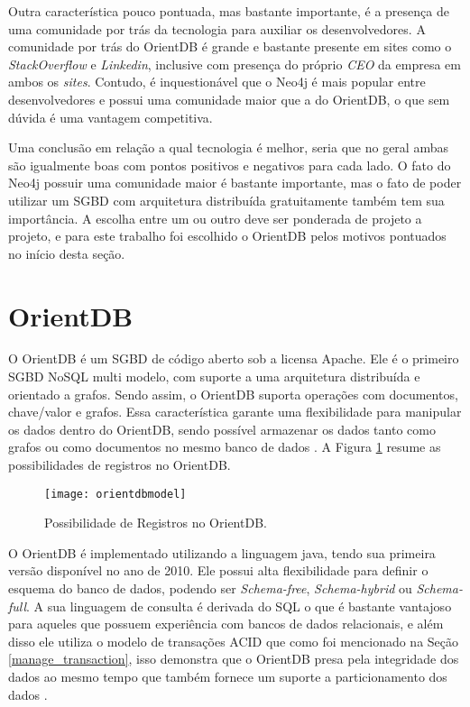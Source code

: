 	Outra característica pouco pontuada, mas bastante importante, é a presença de uma comunidade por trás da tecnologia para auxiliar os desenvolvedores. A comunidade por trás do OrientDB é grande e bastante presente em sites como o \textit{StackOverflow} \cite{orientStack} e \textit{Linkedin}, inclusive com presença do próprio \textit{CEO} da empresa em ambos os \textit{sites}. Contudo, é inquestionável que o Neo4j é mais popular entre desenvolvedores e possui uma comunidade maior que a do OrientDB, o que sem dúvida é uma vantagem competitiva.
	
	Uma conclusão em relação a qual tecnologia é melhor, seria que no geral ambas são igualmente boas com pontos positivos e negativos para cada lado. O fato do Neo4j possuir uma comunidade maior é bastante importante, mas o fato de poder utilizar um SGBD com arquitetura distribuída gratuitamente também tem sua importância. A escolha entre um ou outro deve ser ponderada de projeto a projeto, e para este trabalho foi escolhido o OrientDB pelos motivos pontuados no início desta seção.

\section{OrientDB} \label{OrientDBMain}
	
	O OrientDB é um SGBD de código aberto sob a licensa Apache. Ele é o primeiro SGBD NoSQL multi modelo, com suporte a uma arquitetura distribuída e orientado a grafos. Sendo assim, o OrientDB suporta operações com documentos, chave/valor e grafos. Essa característica garante uma flexibilidade para manipular os dados dentro do OrientDB, sendo possível armazenar os dados tanto como grafos ou como documentos no mesmo banco de dados \cite{OrientDB}. A Figura \ref{fig:orientdbpossibilities} resume as possibilidades de registros no OrientDB.
	
\begin{figure}[h]
	\centering
    \texttt{[image: orientdbmodel]}
    \caption{Possibilidade de Registros no OrientDB.}
    \label{fig:orientdbpossibilities}
\end{figure}
	
	O OrientDB é implementado utilizando a linguagem java, tendo sua primeira versão disponível no ano de 2010. Ele possui alta flexibilidade para definir o esquema do banco de dados, podendo ser \textit{Schema-free}, \textit{Schema-hybrid} ou \textit{Schema-full}. A sua linguagem de consulta é derivada do SQL o que é bastante vantajoso para aqueles que possuem experiência com bancos de dados relacionais, e além disso ele utiliza o modelo de transações ACID que como foi mencionado na Seção \ref{manage_transaction}, isso demonstra que o OrientDB presa pela integridade dos dados ao mesmo tempo que também fornece um suporte a particionamento dos dados \cite{OrientDB} \cite{vschart}.
	
